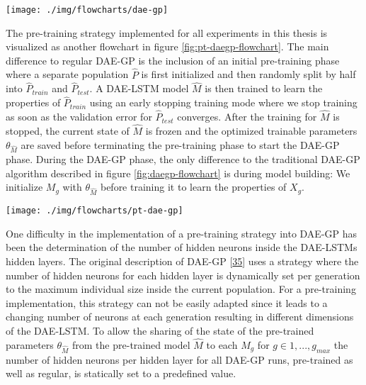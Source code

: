 \documentclass[
  11pt,
]{article}
\let\origfigure\figure
\let\endorigfigure\endfigure
\renewenvironment{figure}[1][2] {
    \expandafter\origfigure\expandafter[H]
} {
    \endorigfigure
}
\begin{document}
\begin{figure}[c]

{\centering \texttt{[image: ./img/flowcharts/dae-gp]} 

}

\caption{Regular DAE-GP Flowchart}\label{fig:daegp-flowchart}
\end{figure}

The pre-training strategy implemented for all experiments in this thesis is visualized as another flowchart in figure \ref{fig:pt-daegp-flowchart}.
The main difference to regular DAE-GP is the inclusion of an initial pre-training phase where a separate population \(\hat{P}\) is first initialized and then randomly split by half into \(\hat{P}_{train}\) and \(\hat{P}_{test}\).
A DAE-LSTM model \(\hat{M}\) is then trained to learn the properties of \(\hat{P}_{train}\) using an early stopping training mode where we stop training as soon as the validation error for \(\hat{P}_{test}\) converges.
After the training for \(\hat{M}\) is stopped, the current state of \(\hat{M}\) is frozen and the optimized trainable parameters \(\theta_{\hat{M}}\) are saved before terminating the pre-training phase to start the DAE-GP phase.
During the DAE-GP phase, the only difference to the traditional DAE-GP algorithm described in figure \ref{fig:daegp-flowchart} is during model building: We initialize \(M_g\) with \(\theta_{\hat{M}}\) before training it to learn the properties of \(X_g\).

\begin{figure}[c]

{\centering \texttt{[image: ./img/flowcharts/pt-dae-gp]} 

}

\caption{Pre-Trained DAE-GP Flowchart}\label{fig:pt-daegp-flowchart}
\end{figure}

One difficulty in the implementation of a pre-training strategy into DAE-GP has been the determination of the number of hidden neurons inside the DAE-LSTMs hidden layers.
The original description of DAE-GP {[}\protect\hyperlink{ref-dae-gp_2020_rtree}{35}{]} uses a strategy where the number of hidden neurons for each hidden layer is dynamically set per generation to the maximum individual size inside the current population.
For a pre-training implementation, this strategy can not be easily adapted since it leads to a changing number of neurons at each generation resulting in different dimensions of the DAE-LSTM.
To allow the sharing of the state of the pre-trained parameters \(\theta_{\hat{M}}\) from the pre-trained model \(\hat{M}\) to each \(M_g\) for \(g\in{1,...,g_{max}}\) the number of hidden neurons per hidden layer for all DAE-GP runs, pre-trained as well as regular, is statically set to a predefined value.
\end{document}
